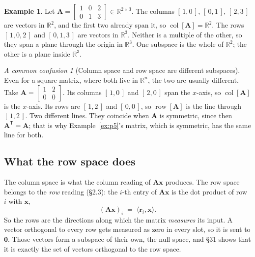 \documentclass[11pt]{article}
\theoremstyle{plain}
\theoremstyle{definition}
\newtheorem{ex}{Example}[section]
\theoremstyle{remark}
\newtheorem*{warn}{A common confusion}
\newcommand{\R}{\mathbb{R}}
\newcommand{\vc}[1]{\mathbf{#1}}        %
\newcommand{\mt}[1]{\mathbf{#1}}        %
\newcommand{\T}{^{\mathsf{T}}}          %
\newcommand{\colsp}[1]{\operatorname{col}[#1]}
\newcommand{\rowsp}[1]{\operatorname{row}[#1]}
\begin{document}
\begin{ex}
Let $\mt{A}=\begin{bmatrix}1&0&2\\0&1&3\end{bmatrix}\in\R^{2\times3}$. The
columns $[\,1,0\,]$, $[\,0,1\,]$, $[\,2,3\,]$ are vectors in $\R^{2}$, and the
first two already span it, so $\colsp{\mt{A}}=\R^{2}$. The rows
$[\,1,0,2\,]$ and $[\,0,1,3\,]$ are vectors in $\R^{3}$. Neither is a multiple of
the other, so they span a plane through the origin in $\R^{3}$. One subspace is
the whole of $\R^{2}$; the other is a plane inside $\R^{3}$.
\end{ex}

\begin{warn}[Column space and row space are different subspaces]
Even for a square matrix, where both live in $\R^{n}$, the two are usually
different. Take
$\mt{A}=\begin{bmatrix}1&2\\0&0\end{bmatrix}$. Its columns $[\,1,0\,]$ and
$[\,2,0\,]$ span the $x$-axis, so $\colsp{\mt{A}}$ is the $x$-axis. Its rows are
$[\,1,2\,]$ and $[\,0,0\,]$, so $\rowsp{\mt{A}}$ is the line through
$[\,1,2\,]$. Two different lines. They coincide when $\mt{A}$ is symmetric,
since then $\mt{A}\T=\mt{A}$; that is why Example~\ref{ex:p5}'s matrix, which
is symmetric, has the same line for both.
\end{warn}

\subsection{What the row space does}
The column space is what the column reading of $\mt{A}\vc{x}$ produces. The
row space belongs to the \emph{row} reading (\S2.3): the $i$-th entry of
$\mt{A}\vc{x}$ is the dot product of row $i$ with $\vc{x}$,
\[
  (\mt{A}\vc{x})_i \;=\; \langle\vc{r}_i,\vc{x}\rangle .
\]
So the rows are the directions along which the matrix \emph{measures} its
input. A vector orthogonal to every row gets measured as zero in every slot,
so it is sent to $\vc{0}$. Those vectors form a subspace of their own, the
null space, and \S31 shows that it is exactly the set of vectors orthogonal to
the row space.

\end{document}
